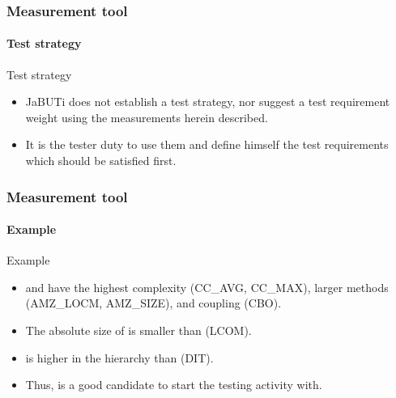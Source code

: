 \begin{frame}[parent={cmap:jabuti-measurement-tool},hasnext=true,hasprev=true]
\frametitle{Measurement tool}
\framesubtitle{Test strategy}

\begin{block:fact}{Test strategy}
\begin{itemize}
	\item JaBUTi does not establish a test strategy, nor suggest a test
	requirement weight using the measurements herein described.

	\item It is the tester duty to use them and define himself the test
	requirements which should be satisfied first.
\end{itemize}
\end{block:fact}

\end{frame}



\begin{frame}
\frametitle{Measurement tool}
\framesubtitle{Example}
\label{concept:jabuti-measurement-tool}

\begin{block}{Example}
\begin{itemize}
	\item {} and 
	have the highest complexity (CC\_AVG, CC\_MAX), larger methods (AMZ\_LOCM, AMZ\_SIZE),
	and coupling (CBO).

	\item The absolute size of  is smaller
	than  (LCOM).

	\item {} is higher in the hierarchy than
	 (DIT).

	\item Thus,  is a good candidate to
	start the testing activity with.
\end{itemize}
\end{block}
\end{frame}

